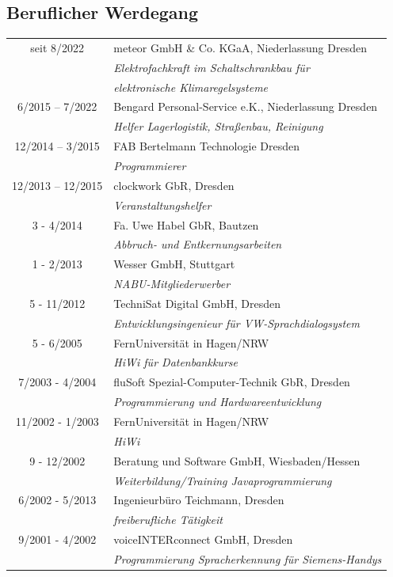 \documentclass{article}
\begin{document}
\subsection*{Beruflicher Werdegang}
\begin{tabular}{cp{15cm}}
seit 8/2022     &   meteor GmbH \& Co. KGaA, Niederlassung Dresden \\
                        &   \it{Elektrofachkraft im Schaltschrankbau f\"ur } \\
                        &   \it{elektronische Klimaregelsysteme}\\
                        
6/2015 -- 7/2022			& 	Bengard Personal-Service e.K., Niederlassung Dresden\\
	    				& 	\it{Helfer Lagerlogistik, Stra\ss{}enbau, Reinigung}\\
12/2014  --  3/2015 	& FAB Bertelmann Technologie Dresden\\
		  				& \it{Programmierer}\\
12/2013  --  12/2015 	& clockwork GbR, Dresden\\
		   				& \it{Veranstaltungshelfer}\\
3 - 4/2014		& Fa. Uwe Habel GbR, Bautzen\\
				& \it{Abbruch- und Entkernungsarbeiten}\\
1 - 2/2013		& Wesser GmbH, Stuttgart\\
				& \it{NABU-Mitgliederwerber}\\
5 - 11/2012		& TechniSat Digital GmbH, Dresden\\
				& \it{Entwicklungsingenieur für VW-Sprachdialogsystem}\\
5 - 6/2005		& FernUniversit\"at in Hagen/NRW\\
				& \it{HiWi für Datenbankkurse}\\
7/2003 - 4/2004	& fluSoft Spezial-Computer-Technik GbR, Dresden\\
				& \it{Programmierung und Hardwareentwicklung}\\
11/2002 - 1/2003	& FernUniversit\"at in Hagen/NRW\\
				& \it{HiWi}\\
9 - 12/2002		& Beratung und Software GmbH, Wiesbaden/Hessen\\
				& \it{Weiterbildung/Training Javaprogrammierung}\\
6/2002 - 5/2013	& Ingenieurb\"uro Teichmann, Dresden\\
				& \it{freiberufliche T\"atigkeit}\\
9/2001 - 4/2002	& voiceINTERconnect GmbH, Dresden\\
				& \it{Programmierung Spracherkennung für Siemens-Handys}\\
\end{tabular}
\end{document}
